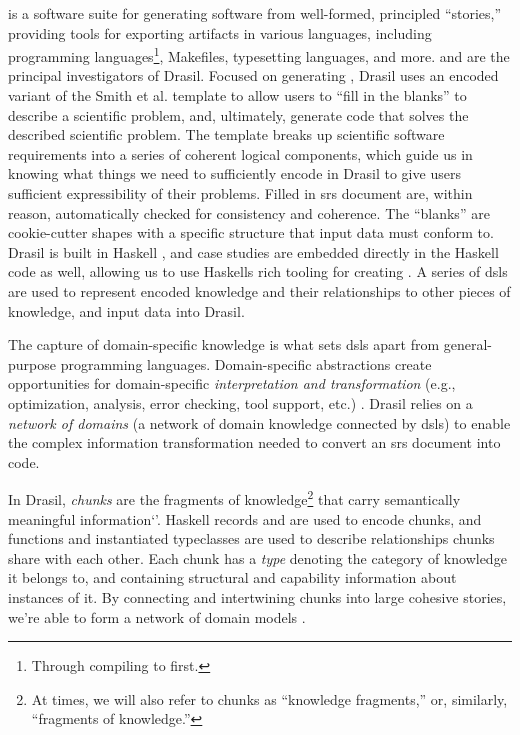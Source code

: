  is a software suite
for generating software from well-formed, principled ``stories,'' providing
tools for exporting artifacts in various languages, including programming
languages\footnote{Through compiling to  \cite{Carette2019} first.},
Makefiles, typesetting languages, and more.  and  are the principal investigators of
Drasil. Focused on generating , Drasil uses an encoded variant of the
Smith et al. \cite{SmithAndLai2005}  template to allow users to ``fill
in the blanks'' to describe a scientific problem, and, ultimately, generate code
that solves the described scientific problem. The template breaks up scientific
software requirements into a series of coherent logical components, which guide
us in knowing what things we need to sufficiently encode in Drasil to give users
sufficient expressibility of their problems. Filled in \acs{srs} document are,
within reason, automatically checked for consistency and coherence. The
``blanks'' are cookie-cutter shapes with a specific structure that input data
must conform to. Drasil is built in Haskell \cite{Haskell2010}, and case studies
are embedded directly in the Haskell code as well, allowing us to use Haskells
rich tooling for creating . A series of \acsp{dsl} are used to
represent encoded knowledge and their relationships to other pieces of
knowledge, and input data into Drasil.

The capture of domain-specific knowledge is what sets \acsp{dsl} apart from
general-purpose programming languages. Domain-specific abstractions create
opportunities for domain-specific \textit{interpretation and transformation}
(e.g., optimization, analysis, error checking, tool support, etc.)
\cite{Czarnecki2005}. Drasil relies on a \textit{network of domains} (a network
of domain knowledge connected by \aclp{dsl}) to enable the complex information
transformation needed to convert an \acs{srs} document into code.

In Drasil, \textit{chunks} are the fragments of knowledge\footnote{At times, we
      will also refer to chunks as ``knowledge fragments,'' or, similarly,
      ``fragments of knowledge.''} that carry semantically meaningful
information`'. Haskell records and  are used to encode chunks,
and functions and instantiated typeclasses are used to describe
relationships chunks share with each other. Each chunk has a \textit{type}
denoting the category of knowledge it belongs to, and containing
structural and capability information about instances of it. By connecting
and intertwining chunks into large cohesive stories, we're able to form a
network of domain models \cite{Czarnecki2005}.

